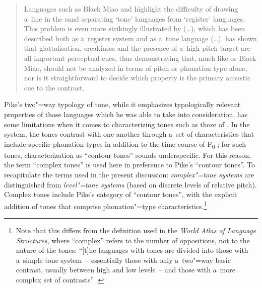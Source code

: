 \begin{quotation}
	Languages such as Black Miao and  highlight the difficulty of drawing a~line in 
	the sand separating ‘tone’ languages from ‘register’ languages. This problem is even more 
	strikingly illustrated by  ({\dots}), which has been described both as a~register system 
	\citep[e.g.][]{bradley1982, jones1986} and as a~tone language \citep[e.g.][]{watkins2001a, gruber2011} ({\dots}). \citet{gruber2011} has shown that glottalisation, creakiness and the presence of a~high pitch target are all important perceptual cues, thus demonstrating that, much like  or Black Miao,  should not be analyzed in terms of pitch or phonation type alone, nor is it straightforward to decide which property is the primary acoustic cue to the contrast. \citep[194]{brunelleetal2016}
\end{quotation}

Pike’s two"=way typology of tone,
while it emphasizes typologically relevant properties of those languages which he was able to take
into consideration, has some limitations when it comes to characterizing tones such as those of . In the  system, the tones contrast with one another through a~set of characteristics that include specific phonation types in addition to
the time course of F\textsubscript{0}
\citep{alves1995,mixdorffetal2003,brunelleetal2010,nguyenetal2013,macetal2015}; for such tones, characterization as “{contour} tones” sounds underspecific.
For this reason, the term “complex tones” is used here in preference to Pike’s “{contour} tones”. To
recapitulate the terms used in the present discussion: \textit{complex"=tone systems} are distinguished from \textit{level"=tone systems} (based on
discrete levels of relative pitch). Complex tones include
Pike’s category of “{contour} tones”, with the explicit addition of tones that comprise phonation"=type
characteristics.\footnote{Note that this differs from the definition used in the \textit{World Atlas of
  Language Structures}, where “complex” refers to the number of oppositions, not to the nature of the
  tones: “[t]he languages with tones are divided into those with a~simple tone system~-- essentially
  those with only a~two"=way basic contrast, usually between high and low levels~-- and those with
  a~more complex set of contrasts” \citep{Maddieson2011}.}

